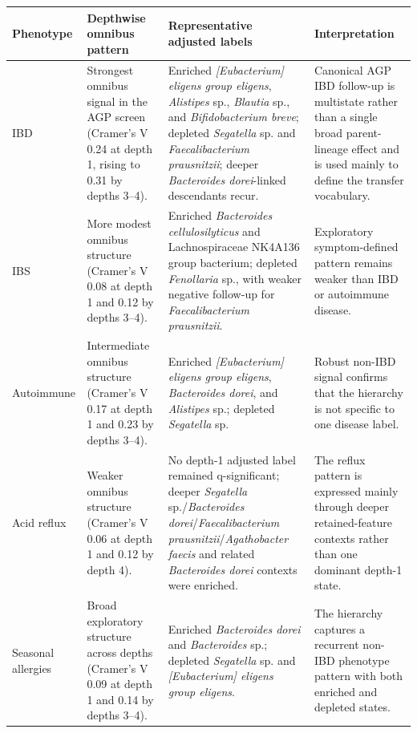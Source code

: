\documentclass[11pt]{article}
\begin{document}
\begin{center}
\scriptsize
\begin{tabularx}{\textwidth}{@{} l Y Y Y @{}}
\toprule
Phenotype & Depthwise omnibus pattern & Representative adjusted labels & Interpretation \\
\midrule
IBD & Strongest omnibus signal in the AGP screen (Cramer's V 0.24 at depth 1, rising to 0.31 by depths 3--4). & Enriched \emph{[Eubacterium] eligens group eligens}, \emph{Alistipes} sp., \emph{Blautia} sp., and \emph{Bifidobacterium breve}; depleted \emph{Segatella} sp. and \emph{Faecalibacterium prausnitzii}; deeper \emph{Bacteroides dorei}-linked descendants recur. & Canonical AGP IBD follow-up is multistate rather than a single broad parent-lineage effect and is used mainly to define the transfer vocabulary. \\
IBS & More modest omnibus structure (Cramer's V 0.08 at depth 1 and 0.12 by depths 3--4). & Enriched \emph{Bacteroides cellulosilyticus} and Lachnospiraceae NK4A136 group bacterium; depleted \emph{Fenollaria} sp., with weaker negative follow-up for \emph{Faecalibacterium prausnitzii}. & Exploratory symptom-defined pattern remains weaker than IBD or autoimmune disease. \\
Autoimmune & Intermediate omnibus structure (Cramer's V 0.17 at depth 1 and 0.23 by depths 3--4). & Enriched \emph{[Eubacterium] eligens group eligens}, \emph{Bacteroides dorei}, and \emph{Alistipes} sp.; depleted \emph{Segatella} sp. & Robust non-IBD signal confirms that the hierarchy is not specific to one disease label. \\
Acid reflux & Weaker omnibus structure (Cramer's V 0.06 at depth 1 and 0.12 by depth 4). & No depth-1 adjusted label remained q-significant; deeper \emph{Segatella} sp./\emph{Bacteroides dorei}/\emph{Faecalibacterium prausnitzii}/\emph{Agathobacter faecis} and related \emph{Bacteroides dorei} contexts were enriched. & The reflux pattern is expressed mainly through deeper retained-feature contexts rather than one dominant depth-1 state. \\
Seasonal allergies & Broad exploratory structure across depths (Cramer's V 0.09 at depth 1 and 0.14 by depths 3--4). & Enriched \emph{Bacteroides dorei} and \emph{Bacteroides} sp.; depleted \emph{Segatella} sp. and \emph{[Eubacterium] eligens group eligens}. & The hierarchy captures a recurrent non-IBD phenotype pattern with both enriched and depleted states. \\
\bottomrule
\end{tabularx}
\end{center}
\end{document}
